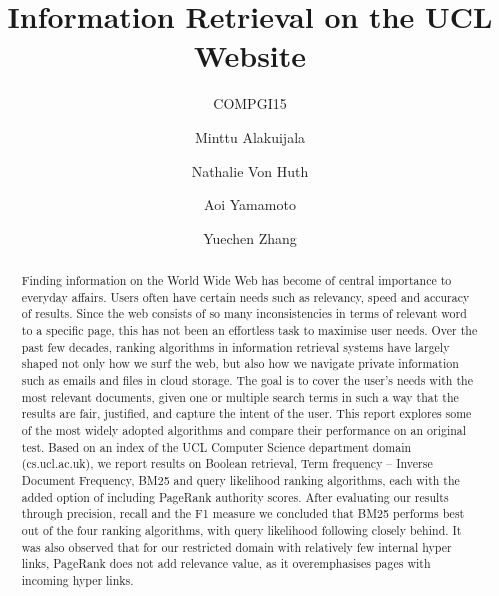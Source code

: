 \documentclass[sigconf]{acmart}
\begin{document}
\title{Information Retrieval on the UCL Website}
\subtitle{COMPGI15}


\author{Minttu Alakuijala}
\affiliation{\institution{}}

\author{Nathalie Von Huth}
\affiliation{\institution{}}

\author{Aoi Yamamoto}
\affiliation{\institution{}}

\author{Yuechen Zhang}
\affiliation{\institution{}}



\begin{abstract}
Finding information on the World Wide Web has become of central importance to everyday affairs. Users often have certain needs such as relevancy, speed and accuracy of results. Since the web consists of so many inconsistencies in terms of relevant word to a specific page, this has not been an effortless task to maximise user needs. Over the past few decades, ranking algorithms in information retrieval systems have largely shaped not only how we surf the web, but also how we navigate private information such as emails and files in cloud storage. The goal is to cover the user's needs with the most relevant documents, given one or multiple search terms in such a way that the results are fair, justified, and capture the intent of the user. This report explores some of the most widely adopted algorithms and compare their performance on an original test. Based on an index of the UCL Computer Science department domain (cs.ucl.ac.uk), we report results on Boolean retrieval, Term frequency -- Inverse Document Frequency, BM25 and query likelihood ranking algorithms, each with the added option of including PageRank authority scores. After evaluating our results through precision, recall and the F1 measure we concluded that BM25 performs best out of the four ranking algorithms, with query likelihood following closely behind. It was also observed that for our restricted domain with relatively few internal hyper links, PageRank does not add relevance value, as it overemphasises pages with incoming hyper links.
\end{abstract}

\maketitle




 
\end{document}
